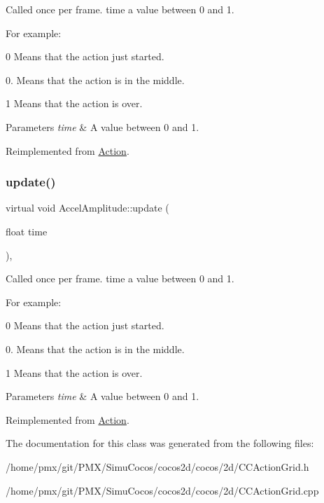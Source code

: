 Called once per frame. time a value between 0 and 1.

For example\+:
\begin{DoxyItemize}
\item 0 Means that the action just started.
\item 0. Means that the action is in the middle.
\item 1 Means that the action is over.
\end{DoxyItemize}


\begin{DoxyParams}{Parameters}
{\em time} & A value between 0 and 1. \\
\hline
\end{DoxyParams}


Reimplemented from \hyperlink{classAction_a937e646e63915e33ad05ba149bfcf239}{Action}.

\mbox{\label{classAccelAmplitude_a982a46aff6babd1ebc114be381e9e0e3}} 
\subsubsection{\texorpdfstring{update()}{update()}\hspace{0.1cm}{\footnotesize\ttfamily [2/2]}}
{\footnotesize\ttfamily virtual void Accel\+Amplitude\+::update (\begin{DoxyParamCaption}\item[{float}]{time }\end{DoxyParamCaption})\hspace{0.3cm}{\ttfamily [override]}, {\ttfamily [virtual]}}

Called once per frame. time a value between 0 and 1.

For example\+:
\begin{DoxyItemize}
\item 0 Means that the action just started.
\item 0. Means that the action is in the middle.
\item 1 Means that the action is over.
\end{DoxyItemize}


\begin{DoxyParams}{Parameters}
{\em time} & A value between 0 and 1. \\
\hline
\end{DoxyParams}


Reimplemented from \hyperlink{classAction_a937e646e63915e33ad05ba149bfcf239}{Action}.



The documentation for this class was generated from the following files\+:\begin{DoxyCompactItemize}
\item 
/home/pmx/git/\+P\+M\+X/\+Simu\+Cocos/cocos2d/cocos/2d/C\+C\+Action\+Grid.\+h\item 
/home/pmx/git/\+P\+M\+X/\+Simu\+Cocos/cocos2d/cocos/2d/C\+C\+Action\+Grid.\+cpp\end{DoxyCompactItemize}
